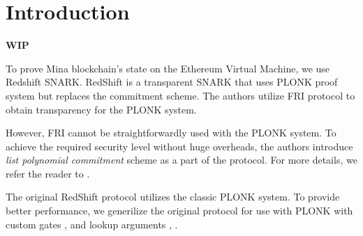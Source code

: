 \section{Introduction}
\label{section:introduction}
\textbf{WIP}

To prove Mina blockchain's state on the Ethereum Virtual Machine, we use Redshift SNARK\cite{cryptoeprint:2019:1400}.
RedShift is a transparent SNARK that uses PLONK\cite{cryptoeprint:2019:953} proof system but replaces the commitment scheme.
The authors utilize FRI\cite{ben2018fast} protocol to obtain transparency for the PLONK system.

However, FRI cannot be straightforwardly used with the PLONK system.
To achieve the required security level without huge overheads, the authors introduce \textit{list polynomial commitment} scheme as a part of the protocol.
For more details, we refer the reader to \cite{cryptoeprint:2019:1400}.

The original RedShift protocol utilizes the classic PLONK\cite{cryptoeprint:2019:953} system.
To provide better performance, we generilize the original protocol for use with PLONK with custom gates \cite{turbo}, \cite{plonkhalo2} and lookup arguments \cite{cryptoeprint:2020:315}, \cite{lookuphalo2}.